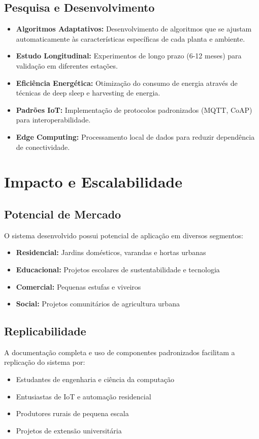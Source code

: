 \subsection{Pesquisa e Desenvolvimento}
\begin{itemize}
    \item \textbf{Algoritmos Adaptativos:} Desenvolvimento de algoritmos que se ajustam automaticamente às características específicas de cada planta e ambiente.
    \item \textbf{Estudo Longitudinal:} Experimentos de longo prazo (6-12 meses) para validação em diferentes estações.
    \item \textbf{Eficiência Energética:} Otimização do consumo de energia através de técnicas de deep sleep e harvesting de energia.
    \item \textbf{Padrões IoT:} Implementação de protocolos padronizados (MQTT, CoAP) para interoperabilidade.
    \item \textbf{Edge Computing:} Processamento local de dados para reduzir dependência de conectividade.
\end{itemize}

\section{Impacto e Escalabilidade}

\subsection{Potencial de Mercado}
O sistema desenvolvido possui potencial de aplicação em diversos segmentos:
\begin{itemize}
    \item \textbf{Residencial:} Jardins domésticos, varandas e hortas urbanas
    \item \textbf{Educacional:} Projetos escolares de sustentabilidade e tecnologia
    \item \textbf{Comercial:} Pequenas estufas e viveiros
    \item \textbf{Social:} Projetos comunitários de agricultura urbana
\end{itemize}

\subsection{Replicabilidade}
A documentação completa e uso de componentes padronizados facilitam a replicação do sistema por:
\begin{itemize}
    \item Estudantes de engenharia e ciência da computação
    \item Entusiastas de IoT e automação residencial
    \item Produtores rurais de pequena escala
    \item Projetos de extensão universitária
\end{itemize}

